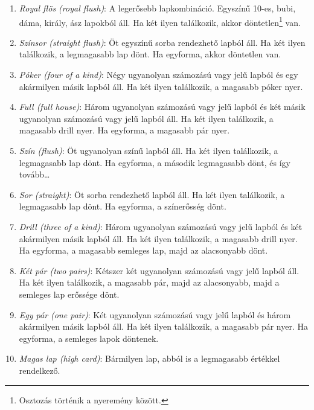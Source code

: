 \documentclass[]{thesis-ekf}
\theoremstyle{definition}
\theoremstyle{remark}
\begin{document}
\begin{enumerate}
	\item \emph{Royal flös (royal flush)}: A legerősebb lapkombináció. Egyszínű 10-es, bubi, dáma, király, ász lapokból áll. Ha két ilyen találkozik, akkor döntetlen\footnote{Osztozás történik a nyeremény között.} van.
	
	\item \emph{Színsor (straight flush)}: Öt egyszínű sorba rendezhető lapból áll. Ha két ilyen találkozik, a legmagasabb lap dönt. Ha egyforma, akkor döntetlen van. 

	\item \emph{Póker (four of a kind)}: Négy ugyanolyan számozású vagy jelű lapból és egy akármilyen másik lapból áll. Ha két ilyen találkozik, a magasabb póker nyer.

	\item \emph{Full (full house)}: Három ugyanolyan számozású vagy jelű lapból és két másik ugyanolyan számozású vagy jelű lapból áll. Ha két ilyen találkozik, a magasabb drill nyer. Ha egyforma, a magasabb pár nyer.

	\item \emph{Szín (flush)}: Öt ugyanolyan színű lapból áll. Ha két ilyen találkozik, a legmagasabb lap dönt. Ha egyforma, a második legmagasabb dönt, és így tovább\dots

	\item \emph{Sor (straight)}: Öt sorba rendezhető lapból áll. Ha két ilyen találkozik, a legmagasabb lap dönt. Ha egyforma, a színerősség dönt.

	\item \emph{Drill (three of a kind)}: Három ugyanolyan számozású vagy jelű lapból és két akármilyen másik lapból áll. Ha két ilyen találkozik, a magasabb drill nyer. Ha egyforma, a magasabb semleges lap, majd az alacsonyabb dönt.

	\item \emph{Két pár (two pairs)}: Kétszer két ugyanolyan számozású vagy jelű lapból áll. Ha két ilyen találkozik, a magasabb pár, majd az alacsonyabb, majd a semleges lap erőssége dönt.

	\item \emph{Egy pár (one pair)}: Két ugyanolyan számozású vagy jelű lapból és három akármilyen másik lapból áll. Ha két ilyen találkozik, a magasabb pár nyer. Ha egyforma, a semleges lapok döntenek.

	\item \emph{Magas lap (high card)}: Bármilyen lap, abból is a legmagasabb értékkel rendelkező.
\end{enumerate}
\end{document}
